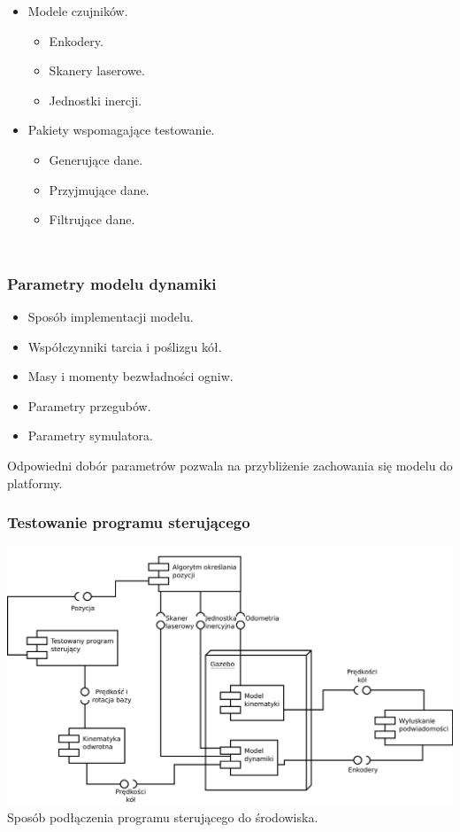 \documentclass{beamer}
\begin{document}
\begin{frame}
\begin{columns}[c]
\begin{itemize}
					\item Modele czujników.
					\begin{itemize}
						\item Enkodery.
						\item Skanery laserowe.
						\item Jednostki inercji.
					\end{itemize}
					\item Pakiety wspomagające testowanie.
					\begin{itemize}
						\item Generujące dane.
						\item Przyjmujące dane.
						\item Filtrujące dane.
					\end{itemize}
				\end{itemize}
		\end{columns}
	\end{frame}
	
	\begin{frame}
		\frametitle{Parametry modelu dynamiki}
		\begin{itemize}
			\item Sposób implementacji modelu.
			\item Współczynniki tarcia i poślizgu kół.
			\item Masy i momenty bezwładności ogniw.
			\item Parametry przegubów.
			\item Parametry symulatora.
		\end{itemize}
		Odpowiedni dobór parametrów pozwala na przybliżenie zachowania się modelu do platformy.

	\end{frame}

	\begin{frame}
		\frametitle{Testowanie programu sterującego}
		\centering
		\includegraphics[width=\textwidth]{graphics/final.pdf} 
		Sposób podłączenia programu sterującego do środowiska.
	\end{frame}
	
\end{document}
